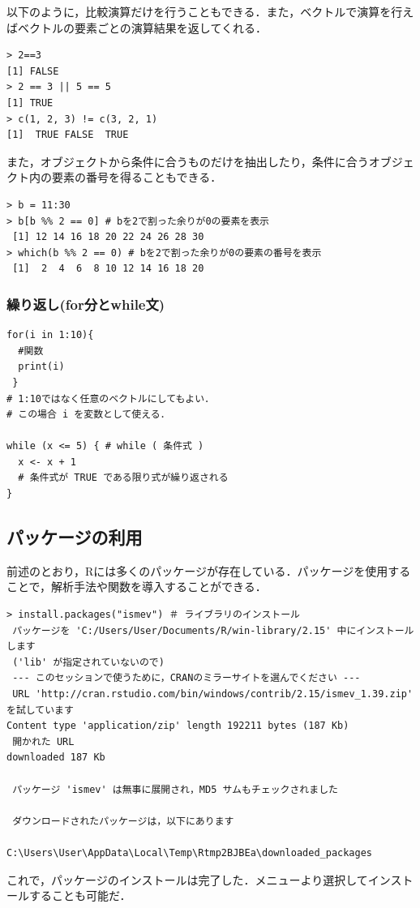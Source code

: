 以下のように，比較演算だけを行うこともできる．また，ベクトルで演算を行えばベクトルの要素ごとの演算結果を返してくれる．
\begin{breakbox}
\begin{verbatim}
> 2==3
[1] FALSE
> 2 == 3 || 5 == 5
[1] TRUE
> c(1, 2, 3) != c(3, 2, 1)
[1]  TRUE FALSE  TRUE
\end{verbatim}
\end{breakbox}

また，オブジェクトから条件に合うものだけを抽出したり，条件に合うオブジェクト内の要素の番号を得ることもできる．
\begin{breakbox}
\begin{verbatim}
> b = 11:30
> b[b %% 2 == 0] # bを2で割った余りが0の要素を表示
 [1] 12 14 16 18 20 22 24 26 28 30
> which(b %% 2 == 0) # bを2で割った余りが0の要素の番号を表示
 [1]  2  4  6  8 10 12 14 16 18 20
\end{verbatim}
\end{breakbox}
\subsubsection{繰り返し(for分とwhile文)}
\begin{screen}
\begin{verbatim}
for(i in 1:10){
  #関数
  print(i)
 }
# 1:10ではなく任意のベクトルにしてもよい．
# この場合 i を変数として使える．

while (x <= 5) { # while ( 条件式 )
  x <- x + 1
  # 条件式が TRUE である限り式が繰り返される
} 

\end{verbatim}
\end{screen}
\subsection{パッケージの利用}
前述のとおり，Rには多くのパッケージが存在している．パッケージを使用することで，解析手法や関数を導入することができる．
\begin{breakbox}
\begin{verbatim}
> install.packages("ismev") ＃ ライブラリのインストール
 パッケージを 'C:/Users/User/Documents/R/win-library/2.15' 中にインストールします 
 ('lib' が指定されていないので) 
 --- このセッションで使うために，CRANのミラーサイトを選んでください --- 
 URL 'http://cran.rstudio.com/bin/windows/contrib/2.15/ismev_1.39.zip' を試しています 
Content type 'application/zip' length 192211 bytes (187 Kb)
 開かれた URL 
downloaded 187 Kb

 パッケージ 'ismev' は無事に展開され，MD5 サムもチェックされました 

 ダウンロードされたパッケージは，以下にあります 
        C:\Users\User\AppData\Local\Temp\Rtmp2BJBEa\downloaded_packages 
\end{verbatim}
\end{breakbox}
これで，パッケージのインストールは完了した．メニューより選択してインストールすることも可能だ．

